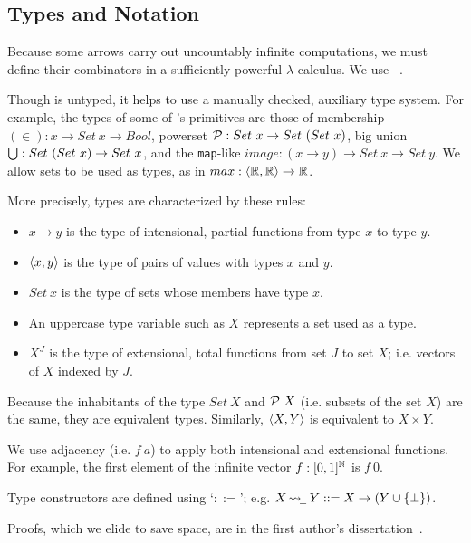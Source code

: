 \documentclass{llncs}
\newcommand{\arrow}{\rightsquigarrow}
\DeclareMathOperator{\botto}{{\arrow\mspace{-3mu}}_\bot}
\begin{document}
\subsection{Types and Notation}

Because some arrows carry out uncountably infinite computations, we must define their combinators in a sufficiently powerful $\lambda$-calculus.
We use \lzfclang~\cite{cit:toronto-2012flops-lzfc}.

Though \lzfclang is untyped, it helps to use a manually checked, auxiliary type system.
For example, the types of some of \lzfclang's primitives are those of membership $(\in) : x \to Set~x \to Bool$, powerset $\mathcal{P} : Set~x \to Set~(Set~x)$, big union $\textstyle\bigcup : Set~(Set~x) \to Set~x$, and the \texttt{map}-like $image : (x \to y) \to Set~x \to Set~y$.
We allow sets to be used as types, as in $max : \langle{\mathbb{R},\mathbb{R}}\rangle \to \mathbb{R}$.

More precisely, types are characterized by these rules:
\begin{itemize}
	\item $x \to y$ is the type of intensional, partial functions from type $x$ to type $y$.
	\item $\langle{x,y}\rangle$ is the type of pairs of values with types $x$ and $y$.
	\item $Set~x$ is the type of sets whose members have type $x$.
	\item An uppercase type variable such as $X$ represents a set used as a type.
	\item $X^J$ is the type of extensional, total functions from set $J$ to set $X$; i.e. vectors of $X$ indexed by $J$.
\end{itemize}
Because the inhabitants of the type $Set~X$ and $\mathcal{P}~X$ (i.e. subsets of the set $X$) are the same, they are equivalent types.
Similarly, $\langle{X,Y}\rangle$ is equivalent to $X \times Y$.

We use adjacency (i.e. $f~a$) to apply both intensional and extensional functions.
For example, the first element of the infinite vector $f : [0,1]^{\mathbb{N}}$ is $f~0$.

Type constructors are defined using `$::=$'; e.g. $X \botto Y ::= X \to (Y \u \set{\bot})$.

Proofs, which we elide to save space, are in the first author's dissertation~\cite{cit:toronto-thesis}.

\end{document}
